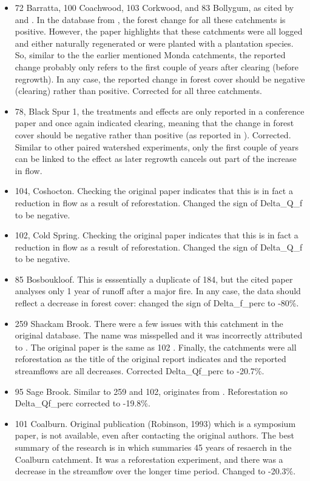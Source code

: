 \documentclass[]{elsarticle} %
\begin{document}
\begin{itemize}
\item
  72 Barratta, 100 Coachwood, 103 Corkwood, and 83 Bollygum, as cited by \citet{cornish1993} and \citet{cornish2001}. In the database from \citet{zhang2017}, the forest change for all these catchments is positive. However, the paper highlights that these catchments were all logged and either naturally regenerated or were planted with a plantation species. So, similar to the the earlier mentioned Monda catchments, the reported change probably only refers to the first couple of years after clearing (before regrowth). In any case, the reported change in forest cover should be negative (clearing) rather than positive. Corrected for all three catchments.
\item
  78, Black Spur 1, the treatments and effects are only reported in a conference paper \citep{jayasuriya1988} and once again indicated clearing, meaning that the change in forest cover should be negative rather than positive (as reported in \citet{zhang2017}). Corrected. Similar to other paired watershed experiments, only the first couple of years can be linked to the effect as later regrowth cancels out part of the increase in flow.
\item
  104, Coshocton. Checking the original paper indicates that this is in fact a reduction in flow as a result of reforestation. Changed the sign of Delta\_Q\_f to be negative.\\
\item
  102, Cold Spring. Checking the original paper \citep{schneider1961} indicates that this is in fact a reduction in flow as a result of reforestation. Changed the sign of Delta\_Q\_f to be negative.\\
\item
  85 Bosboukloof. This is esssentially a duplicate of 184, but the cited paper analyses only 1 year of runoff after a major fire. In any case, the data should reflect a decrease in forest cover: changed the sign of Delta\_f\_perc to -80\%.
\item
  259 Shackam Brook. There were a few issues with this catchment in the original database. The name was misspelled and it was incorrectly attributed to \citet{brown2005}. The original paper is the same as 102 \citep{schneider1961}. Finally, the catchments were all reforestation as the title of the original report indicates and the reported streamflows are all decreases. Corrected Delta\_Qf\_perc to -20.7\%.
\item
  95 Sage Brook. Similar to 259 and 102, originates from \citet{schneider1961}. Reforestation so Delta\_Qf\_perc corrected to -19.8\%.
\item
  101 Coalburn. Original publication (Robinson, 1993) which is a symposium paper, is not available, even after contacting the original authors. The best summary of the research is in \citet{birkinshaw2014} which summaries 45 years of resaerch in the Coalburn catchment. It was a reforestation experiment, and there was a decrease in the streamflow over the longer time period. Changed to -20.3\%.
\end{itemize}
\end{document}
